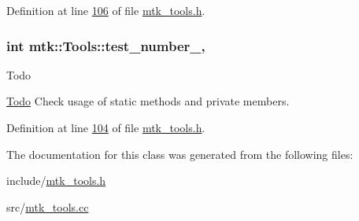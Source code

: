 Definition at line \hyperlink{mtk__tools_8h_source_l00106}{106} of file \hyperlink{mtk__tools_8h_source}{mtk\-\_\-tools.\-h}.

\hypertarget{classmtk_1_1Tools_a04a60458594336ee1badff79b8a9a77f}{
\subsubsection[{test\-\_\-number\-\_\-}]{\setlength{\rightskip}{0pt plus 5cm}int mtk\-::\-Tools\-::test\-\_\-number\-\_\-\hspace{0.3cm}{\ttfamily [static]}, {\ttfamily [private]}}}\label{classmtk_1_1Tools_a04a60458594336ee1badff79b8a9a77f}
\begin{DoxyRefDesc}{Todo}
\item[\hyperlink{todo__todo000020}{Todo}]Check usage of static methods and private members. \end{DoxyRefDesc}


Definition at line \hyperlink{mtk__tools_8h_source_l00104}{104} of file \hyperlink{mtk__tools_8h_source}{mtk\-\_\-tools.\-h}.



The documentation for this class was generated from the following files\-:\begin{DoxyCompactItemize}
\item 
include/\hyperlink{mtk__tools_8h}{mtk\-\_\-tools.\-h}\item 
src/\hyperlink{mtk__tools_8cc}{mtk\-\_\-tools.\-cc}\end{DoxyCompactItemize}
